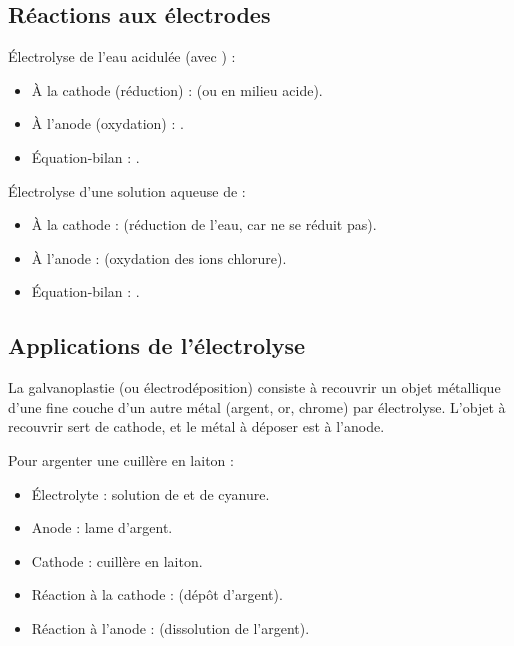 \subsection{Réactions aux électrodes}

\begin{exemple}
Électrolyse de l'eau acidulée (avec ) :
\begin{itemize}
    \item À la cathode (réduction) :  (ou  en milieu acide).
    \item À l'anode (oxydation) : .
    \item Équation-bilan : .
\end{itemize}
\end{exemple}

\begin{exemple}
Électrolyse d'une solution aqueuse de  :
\begin{itemize}
    \item À la cathode :  (réduction de l'eau, car  ne se réduit pas).
    \item À l'anode :  (oxydation des ions chlorure).
    \item Équation-bilan : .
\end{itemize}
\end{exemple}

\subsection{Applications de l'électrolyse}

\begin{propriete}[Galvanoplastie]
La galvanoplastie (ou électrodéposition) consiste à recouvrir un objet métallique d'une fine couche d'un autre métal (argent, or, chrome) par électrolyse. L'objet à recouvrir sert de cathode, et le métal à déposer est à l'anode.
\end{propriete}

\begin{exemple}[Argenture]
Pour argenter une cuillère en laiton :
\begin{itemize}
    \item Électrolyte : solution de  et de cyanure.
    \item Anode : lame d'argent.
    \item Cathode : cuillère en laiton.
    \item Réaction à la cathode :  (dépôt d'argent).
    \item Réaction à l'anode :  (dissolution de l'argent).
\end{itemize}
\end{exemple}

